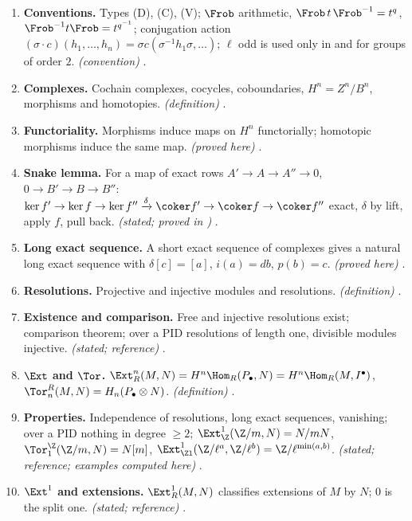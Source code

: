 \begin{enumerate}[label=\textbf{\thechapter.\arabic*}]
\item \textbf{Conventions.} Types (D), (C), (V); $\Frob$ arithmetic, $\Frob\,t\,\Frob^{-1}=t^q$, $\Frob^{-1}t\Frob=t^{q^{-1}}$; conjugation action
$(\sigma\cdot c)(h_1,\dots,h_n)=\sigma c(\sigma^{-1}h_1\sigma,\dots)$; $\ell$ odd is used only in  and for groups of order $2$. \emph{(convention)}
.
\item \textbf{Complexes.} Cochain complexes, cocycles, coboundaries, $H^n=Z^n/B^n$, morphisms and homotopies. \emph{(definition)} .
\item \textbf{Functoriality.} Morphisms induce maps on $H^n$ functorially; homotopic morphisms induce the same map. \emph{(proved here)} .
\item \textbf{Snake lemma.} For a map of exact rows $A'\to A\to A''\to0$, $0\to B'\to B\to B''$: $\ker f'\to\ker f\to\ker f''\xrightarrow{\delta}\coker f'\to\coker f\to\coker f''$ exact, $\delta$ by
lift, apply $f$, pull back. \emph{(stated; proved in )} .
\item \textbf{Long exact sequence.} A short exact sequence of complexes gives a natural long exact sequence with $\delta[c]=[a]$, $i(a)=db$, $p(b)=c$. \emph{(proved here)}
.
\item \textbf{Resolutions.} Projective and injective modules and resolutions. \emph{(definition)} .
\item \textbf{Existence and comparison.} Free and injective resolutions exist; comparison theorem; over a PID resolutions of length one, divisible modules
injective. \emph{(stated; reference)} .
\item \textbf{$\Ext$ and $\Tor$.} $\Ext^n_R(M,N)=H^n\Hom_R(P_\bullet,N)=H^n\Hom_R(M,I^\bullet)$, $\Tor_n^R(M,N)=H_n(P_\bullet\otimes N)$. \emph{(definition)} .
\item \textbf{Properties.} Independence of resolutions, long exact sequences, vanishing; over a PID nothing in degree $\ge2$; $\Ext^1_\Z(\Z/m,N)=N/mN$,
$\Tor_1^\Z(\Z/m,N)=N[m]$, $\Ext^1_{\Zl}(\Z/\ell^a,\Z/\ell^b)=\Z/\ell^{\min(a,b)}$. \emph{(stated; reference; examples computed here)} .
\item \textbf{$\Ext^1$ and extensions.} $\Ext^1_R(M,N)$ classifies extensions of $M$ by $N$; $0$ is the split one. \emph{(stated; reference)} .

\end{enumerate}
